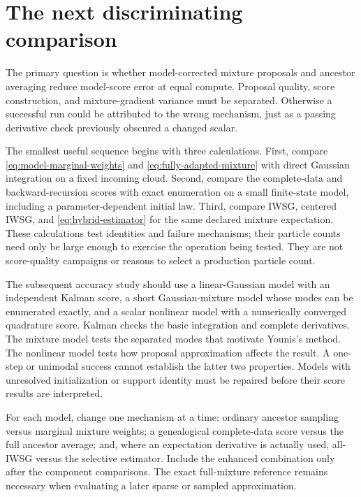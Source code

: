 \section{The next discriminating comparison}
\label{sec:next-study}

The primary question is whether model-corrected mixture proposals and
ancestor averaging reduce model-score error at equal compute. Proposal
quality, score construction, and mixture-gradient variance must be separated.
Otherwise a successful run could be attributed to the wrong mechanism, just
as a passing derivative check previously obscured a changed scalar.

The smallest useful sequence begins with three calculations. First, compare
\eqref{eq:model-marginal-weights} and
\eqref{eq:fully-adapted-mixture} with direct Gaussian integration on a fixed
incoming cloud. Second, compare the complete-data and backward-recursion
scores with exact enumeration on a small finite-state model, including a
parameter-dependent initial law. Third, compare IWSG, centered IWSG, and
\eqref{eq:hybrid-estimator} for the same declared mixture expectation.
These calculations test identities and failure mechanisms; their particle
counts need only be large enough to exercise the operation being tested.
They are not score-quality campaigns or reasons to select a production
particle count.

The subsequent accuracy study should use a linear-Gaussian model with an
independent Kalman score, a short Gaussian-mixture model whose modes can be
enumerated exactly, and a scalar nonlinear model with a numerically converged
quadrature score. Kalman checks the basic integration and complete derivatives.
The mixture model tests the separated modes that motivate Younis's method.
The nonlinear model tests how proposal approximation affects the result.
A one-step or unimodal success cannot establish the latter two properties.
Models with unresolved initialization or support identity must be repaired
before their score results are interpreted.

For each model, change one mechanism at a time: ordinary ancestor sampling
versus marginal mixture weights; a genealogical complete-data score versus
the full ancestor average; and, where an expectation derivative is actually
used, all-IWSG versus the selective estimator. Include the enhanced
combination only after the component comparisons. The exact full-mixture
reference remains necessary when evaluating a later sparse or sampled
approximation.

